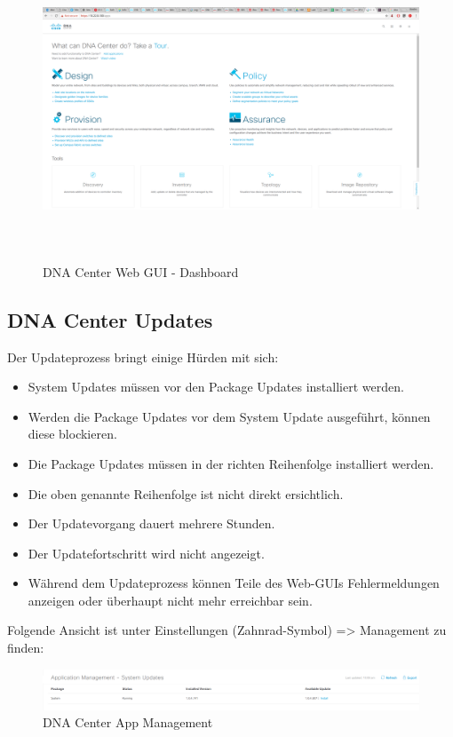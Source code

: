 \begin{figure}[H]
	\centering
	\includegraphics[height=9cm]{img/sc_008.png}
	\caption{DNA Center Web GUI - Dashboard}
	\label{fig:dna-center-gui-4}
\end{figure}

\subsection{DNA Center Updates}

Der Updateprozess bringt einige Hürden mit sich:
\begin{itemize}
	\item System Updates müssen vor den Package Updates installiert werden.
	\item Werden die Package Updates vor dem System Update ausgeführt, können diese blockieren. 
	\item Die Package Updates müssen in der richten Reihenfolge installiert werden.
	\item Die oben genannte Reihenfolge ist nicht direkt ersichtlich.
	\item Der Updatevorgang dauert mehrere Stunden.
	\item Der Updatefortschritt wird nicht angezeigt. 
	\item Während dem Updateprozess können Teile des Web-GUIs Fehlermeldungen anzeigen oder überhaupt nicht mehr erreichbar sein.
\end{itemize}

Folgende Ansicht ist unter Einstellungen (Zahnrad-Symbol) => Management zu finden:

\begin{figure}[H]
	\centering
	\includegraphics[width=\columnwidth]{img/sc_009.png}
	\caption{DNA Center App Management}
	\label{fig:dna-center-gui-update-1}
\end{figure}

